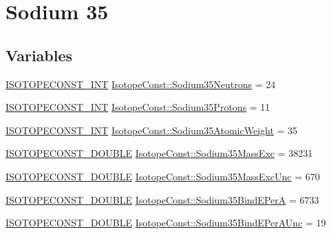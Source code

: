\hypertarget{group___isotope_const-_sodium-_na35}{}\section{Sodium 35}
\label{group___isotope_const-_sodium-_na35}
\subsection*{Variables}
\begin{DoxyCompactItemize}
\item 
\mbox{\hyperlink{group___isotope_const-_macros_ga5f18360b3e99483a35c32d789e62621c}{I\+S\+O\+T\+O\+P\+E\+C\+O\+N\+S\+T\+\_\+\+I\+NT}} \mbox{\hyperlink{group___isotope_const-_sodium-_na35_ga0f090b0709e83355d3128c71f132393d}{Isotope\+Const\+::\+Sodium35\+Neutrons}} = 24
\item 
\mbox{\hyperlink{group___isotope_const-_macros_ga5f18360b3e99483a35c32d789e62621c}{I\+S\+O\+T\+O\+P\+E\+C\+O\+N\+S\+T\+\_\+\+I\+NT}} \mbox{\hyperlink{group___isotope_const-_sodium-_na35_gae1ae00450cc4ecc87079ee7b9f2f2c24}{Isotope\+Const\+::\+Sodium35\+Protons}} = 11
\item 
\mbox{\hyperlink{group___isotope_const-_macros_ga5f18360b3e99483a35c32d789e62621c}{I\+S\+O\+T\+O\+P\+E\+C\+O\+N\+S\+T\+\_\+\+I\+NT}} \mbox{\hyperlink{group___isotope_const-_sodium-_na35_gaba2168b272a9ed5a5b7ec704911ee271}{Isotope\+Const\+::\+Sodium35\+Atomic\+Weight}} = 35
\item 
\mbox{\hyperlink{group___isotope_const-_macros_ga8f45a7272ce02c0b4c65c44636ed719a}{I\+S\+O\+T\+O\+P\+E\+C\+O\+N\+S\+T\+\_\+\+D\+O\+U\+B\+LE}} \mbox{\hyperlink{group___isotope_const-_sodium-_na35_ga684c55355729135848a9787799ece78e}{Isotope\+Const\+::\+Sodium35\+Mass\+Exc}} = 38231
\item 
\mbox{\hyperlink{group___isotope_const-_macros_ga8f45a7272ce02c0b4c65c44636ed719a}{I\+S\+O\+T\+O\+P\+E\+C\+O\+N\+S\+T\+\_\+\+D\+O\+U\+B\+LE}} \mbox{\hyperlink{group___isotope_const-_sodium-_na35_ga8b10d1ddc2b7acbdde3d2629deead3b9}{Isotope\+Const\+::\+Sodium35\+Mass\+Exc\+Unc}} = 670
\item 
\mbox{\hyperlink{group___isotope_const-_macros_ga8f45a7272ce02c0b4c65c44636ed719a}{I\+S\+O\+T\+O\+P\+E\+C\+O\+N\+S\+T\+\_\+\+D\+O\+U\+B\+LE}} \mbox{\hyperlink{group___isotope_const-_sodium-_na35_gac50ceb0d04ff27ae4697bc8d1dd89e06}{Isotope\+Const\+::\+Sodium35\+Bind\+E\+PerA}} = 6733
\item 
\mbox{\hyperlink{group___isotope_const-_macros_ga8f45a7272ce02c0b4c65c44636ed719a}{I\+S\+O\+T\+O\+P\+E\+C\+O\+N\+S\+T\+\_\+\+D\+O\+U\+B\+LE}} \mbox{\hyperlink{group___isotope_const-_sodium-_na35_ga4db2e77be73125238b109f2a10fff90e}{Isotope\+Const\+::\+Sodium35\+Bind\+E\+Per\+A\+Unc}} = 19

\end{DoxyCompactItemize}
